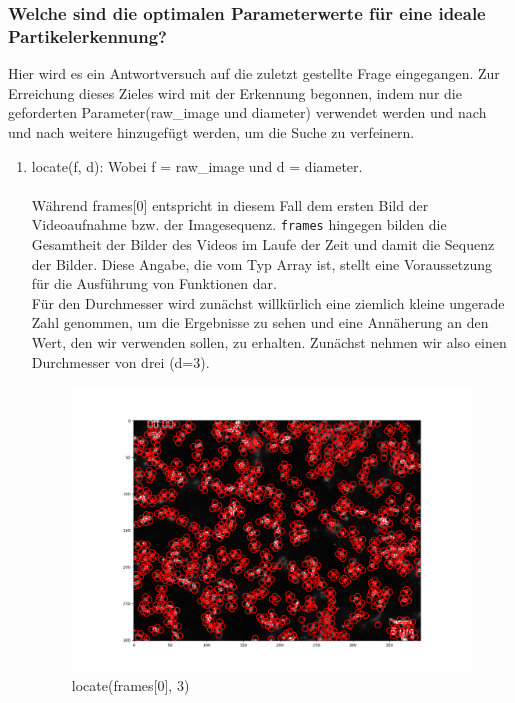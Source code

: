 	\subsubsection{Welche sind die optimalen Parameterwerte für eine ideale Partikelerkennung?}
	Hier wird es ein Antwortversuch auf die zuletzt gestellte Frage eingegangen. Zur Erreichung dieses Zieles wird mit der Erkennung begonnen, indem nur die geforderten Parameter(raw\_image und diameter) verwendet werden und nach und nach weitere hinzugefügt werden, um die Suche zu verfeinern. 
	
	\begin{enumerate}
    			\item locate(f, d): Wobei f = raw\_image und d = diameter. \\ \\
    			 Während frames[0] entspricht in diesem Fall dem ersten Bild der Videoaufnahme bzw. der Imagesequenz. \texttt{frames} hingegen bilden die Gesamtheit der Bilder des Videos im Laufe der Zeit und damit die Sequenz der Bilder.  Diese Angabe, die vom Typ Array ist, stellt eine Voraussetzung für die Ausführung von Funktionen dar. \\
    			 Für den Durchmesser wird zunächst willkürlich eine ziemlich kleine ungerade Zahl genommen, um die Ergebnisse zu sehen und eine Annäherung an den Wert, den wir verwenden sollen, zu erhalten. Zunächst nehmen wir also einen Durchmesser von drei (d=3).  
    			 
\begin{figure}[H]
    \centering
    \includegraphics[scale=0.35]{Grafiken/trackpyBilder/locate(f0, diameter=3).png}
    \caption{locate(frames[0], 3)}
    \label{fig:bild_label}
\end{figure} 


\end{enumerate}

